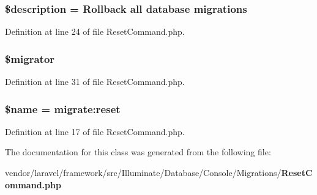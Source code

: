 \subsubsection[{\$description}]{\setlength{\rightskip}{0pt plus 5cm}\$description = \textquotesingle{}Rollback all database migrations\textquotesingle{}\hspace{0.3cm}{\ttfamily [protected]}}\label{class_illuminate_1_1_database_1_1_console_1_1_migrations_1_1_reset_command_a87b032cba06009e3467abf1c8018d960}


Definition at line 24 of file Reset\+Command.\+php.

\subsubsection[{\$migrator}]{\setlength{\rightskip}{0pt plus 5cm}\$migrator\hspace{0.3cm}{\ttfamily [protected]}}\label{class_illuminate_1_1_database_1_1_console_1_1_migrations_1_1_reset_command_aec2ba48e5c793e0c168d4a5aaf932968}


Definition at line 31 of file Reset\+Command.\+php.

\subsubsection[{\$name}]{\setlength{\rightskip}{0pt plus 5cm}\${\bf name} = \textquotesingle{}migrate\+:reset\textquotesingle{}\hspace{0.3cm}{\ttfamily [protected]}}\label{class_illuminate_1_1_database_1_1_console_1_1_migrations_1_1_reset_command_ab2fc40d43824ea3e1ce5d86dee0d763b}


Definition at line 17 of file Reset\+Command.\+php.



The documentation for this class was generated from the following file\+:\begin{DoxyCompactItemize}
\item 
vendor/laravel/framework/src/\+Illuminate/\+Database/\+Console/\+Migrations/{\bf Reset\+Command.\+php}\end{DoxyCompactItemize}
